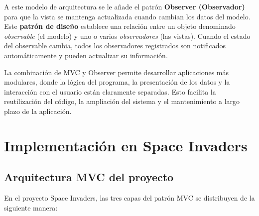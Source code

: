 \documentclass[12pt, a4paper]{article}
\begin{document}
A este modelo de arquitectura se le añade el patrón \textbf{Observer (Observador)} para que la vista se mantenga actualizada cuando cambian los datos del modelo. Este \textbf{patrón de diseño} establece una relación entre un objeto denominado \textit{observable} (el modelo) y uno o varios \textit{observadores} (las vistas). Cuando el estado del observable cambia, todos los observadores registrados son notificados automáticamente y pueden actualizar su información.


La combinación de MVC y Observer permite desarrollar aplicaciones más modulares, donde la lógica del programa, la presentación de los datos y la interacción con el usuario están claramente separadas. Esto facilita la reutilización del código, la ampliación del sistema y el mantenimiento a largo plazo de la aplicación.

\section{Implementación en Space Invaders}

\subsection{Arquitectura MVC del proyecto}

En el proyecto Space Invaders, las tres capas del patrón MVC se distribuyen de la siguiente manera:
\end{document}

